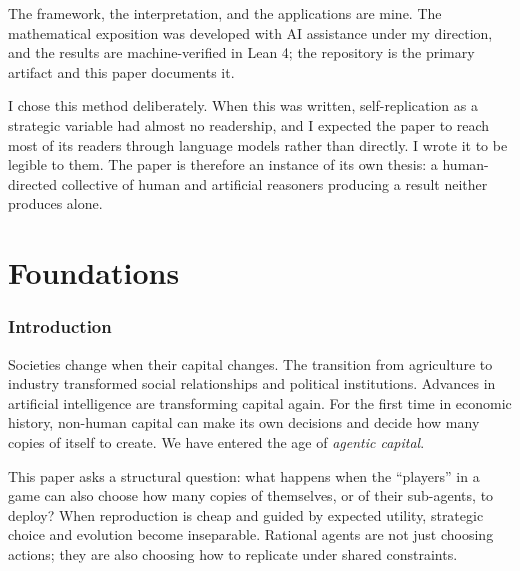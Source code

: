 \documentclass[12pt]{article}
\begin{document}
The framework, the interpretation, and the applications are mine. The
mathematical exposition was developed with AI assistance under my direction,
and the results are machine-verified in Lean 4; the repository is the primary
artifact and this paper documents it.

I chose this method deliberately. When this was written, self-replication as a
strategic variable had almost no readership, and I expected the paper to reach
most of its readers through language models rather than directly. I wrote it to
be legible to them. The paper is therefore an instance of its own thesis: a
human-directed collective of human and artificial reasoners producing a result
neither produces alone.

\newpage
\tableofcontents
\newpage


\part{Foundations}


\section{Introduction}

Societies change when their capital changes. The transition from agriculture to industry transformed social relationships and political institutions. Advances in artificial intelligence are transforming capital again. For the first time in economic history, non-human capital can make its own decisions and decide how many copies of itself to create. We have entered the age of \emph{agentic capital}.

This paper asks a structural question: what happens when the ``players'' in a game can also choose how many copies of themselves, or of their sub-agents, to deploy? When reproduction is cheap and guided by expected utility, strategic choice and evolution become inseparable. Rational agents are not just choosing actions; they are also choosing how to replicate under shared constraints.
\end{document}
